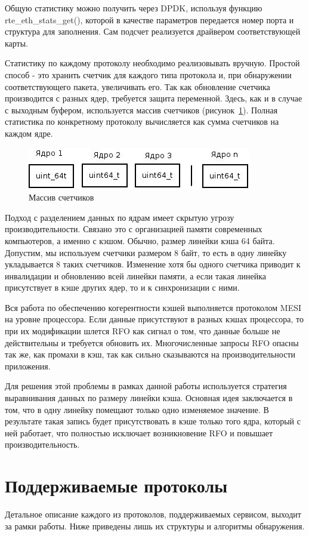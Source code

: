 Общую статистику можно получить через DPDK, используя функцию rte\_eth\_stats\_get(), которой в качестве параметров передается номер порта и структура для заполнения. Сам подсчет реализуется драйвером соответствующей карты.

Статистику по каждому протоколу необходимо реализовывать вручную. Простой способ - это хранить счетчик для каждого типа протокола и, при обнаружении соответствующего пакета, увеличивать его. Так как обновление счетчика производится с разных ядер, требуется защита переменной. Здесь, как и в случае с выходным буфером, используется массив счетчиков (рисунок~\ref{pic:counters}). Полная статистика по конкретному протоколу вычисляется как сумма счетчиков на каждом ядре.
\begin{figure}
\centering
\includegraphics[scale=0.6]{pictures/counters}
\caption{Массив счетчиков}
\label{pic:counters}
\end{figure}

Подход с разделением данных по ядрам имеет скрытую угрозу производительности. Связано это с организацией памяти современных компьютеров, а именно с кэшом. Обычно, размер линейки кэша 64 байта. Допустим, мы используем счетчики размером 8 байт, то есть в одну линейку укладывается 8 таких счетчиков. Изменение хотя бы одного счетчика приводит к инвалидации и обновлению всей линейки памяти, а если такая линейка присутствует в кэше других ядер, то и к синхронизации с ними.

Вся работа по обеспечению когерентности кэшей выполняется протоколом MESI на уровне процессора. Если данные присутствуют в разных кэшах процессора, то при их модификации шлется RFO как сигнал о том, что данные больше не действительны и требуется обновить их. Многочисленные запросы RFO опасны так же, как промахи в кэш, так как сильно сказываются на производительности приложения.

Для решения этой проблемы в рамках данной работы используется стратегия выравнивания данных по размеру линейки кэша. Основная идея заключается в том, что в одну линейку помещают только одно изменяемое значение. В результате такая запись будет присутствовать в кэше только того ядра, который с ней работает, что полностью исключает возникновение RFO и повышает производительность.

\section{Поддерживаемые протоколы}
Детальное описание каждого из протоколов, поддерживаемых сервисом, выходит за рамки работы. Ниже приведены лишь их структуры и алгоритмы обнаружения.

